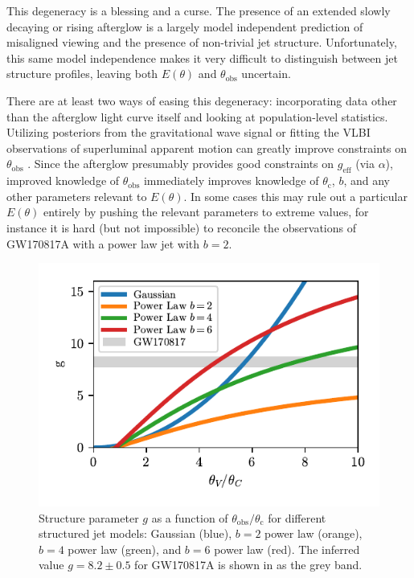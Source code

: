 \documentclass[twocolumn]{aastex62}
\newcommand{\gwbns}{GW170817A}
\newcommand{\thobs}{\ensuremath{\theta_{\mathrm{obs}}}}
\newcommand{\thC}{\ensuremath{\theta_{\mathrm{c}}}}
\newcommand{\geff}{\ensuremath{g_{\mathrm{eff}}}}
\begin{document}
This degeneracy is a blessing and a curse.  The presence of an extended slowly decaying or rising afterglow is a largely model independent prediction of misaligned viewing and the presence of non-trivial jet structure.  Unfortunately, this same model independence makes it very difficult to distinguish between jet structure profiles, leaving both $E(\theta)$ and $\thobs$ uncertain.

There are at least two ways of easing this degeneracy: incorporating data other than the afterglow light curve itself and looking at population-level statistics.  Utilizing posteriors from the gravitational wave signal or fitting the VLBI observations of superluminal apparent motion can greatly improve constraints on $\thobs$ \citep{Troja:2018aa, Hotokezaka:2018aa, Ghirlanda:2019aa}.  Since the afterglow presumably provides good constraints on $\geff$ (via $\alpha$), improved knowledge of $\thobs$ immediately improves knowledge of $\thC$, $b$, and any other parameters relevant to $E(\theta)$.  In some cases this may rule out a particular $E(\theta)$ entirely by pushing the relevant parameters to extreme values, for instance it is hard (but not impossible) to reconcile the observations of \gwbns{} with a power law jet with $b=2$.

\begin{figure}
	\includegraphics[width=\columnwidth]{figs/g_plot.pdf}
	\caption{Structure parameter $g$ as a function of $\thobs/\thC$ for different structured jet models: Gaussian (blue), $b=2$ power law (orange), $b=4$ power law (green), and $b=6$ power law (red).  The inferred value $g = 8.2\pm0.5$ for \gwbns{} is shown in as the grey band. \label{fig:gPop}}
\end{figure}
\end{document}
